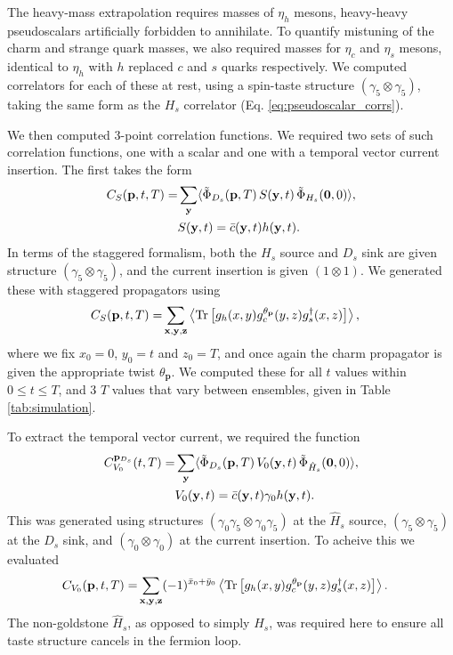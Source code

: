 The heavy-mass extrapolation requires masses of $\eta_h$ mesons, heavy-heavy pseudoscalars artificially forbidden to annihilate. To quantify mistuning of the charm and strange quark masses, we also required masses for $\eta_c$ and $\eta_s$ mesons, identical to $\eta_h$ with $h$ replaced $c$ and $s$ quarks respectively. We computed correlators for each of these at rest, using a spin-taste structure $(\gamma_5\otimes \gamma_5)$, taking the same form as the $H_s$ correlator (Eq. \eqref{eq:pseudoscalar_corrs}).

We then computed 3-point correlation functions. We required two sets of such correlation functions, one with a scalar and one with a temporal vector current insertion. The first takes the form
\begin{align}
  C_S({\textbf{p}},t,T) =& \sum_{{\bf{y}}} \langle \tilde{\Phi}_{D_s}({\bf{p}},T)\, S({\bf{y}},t) \,\tilde{\Phi}_{H_s}({\bf{0}},0) \rangle, \\ &S({\bf{y}},t) = \bar{c}({\bf{y}},t) h({\bf{y}},t). \nonumber
\end{align}
In terms of the staggered formalism, both the $H_s$ source and $D_s$ sink are given structure $(\gamma_5\otimes \gamma_5)$, and the current insertion is given $(1\otimes1)$. We generated these with staggered propagators using
\begin{align}
  C_S({\textbf{p}},t,T) =& \sum_{{\bf{x},\bf{y},\bf{z}}} \left\langle \text{Tr}\left[ g_h(x,y)g^{\theta_{\textbf{p}}}_c(y,z) g^{\dagger}_s(x,z) \right] \right\rangle,
\end{align}
where we fix $x_0 = 0$, $y_0=t$ and $z_0=T$, and once again the charm propagator is given the appropriate twist $\theta_{\textbf{p}}$. We computed these for all $t$ values within $0\leq t\leq T$, and 3 $T$ values that vary between ensembles, given in Table \ref{tab:simulation}.

To extract the temporal vector current, we required the function
\begin{align}
  C^{{\bf{p}}_{D_s}}_{V_0}(t,T) =& \sum_{{\bf{y}}} \langle \tilde{\Phi}_{D_s}({\bf{p}},T)\, V_0({\bf{y}},t) \,\tilde{\Phi}_{\hat{H}_s}({\bf{0}},0) \rangle, \\ &V_0({\bf{y}},t) = \bar{c}({\bf{y}},t) \gamma_0 h({\bf{y}},t). \nonumber
\end{align}
This was generated using structures $(\gamma_0\gamma_5\otimes \gamma_0\gamma_5)$ at the $\hat{H}_s$ source, $(\gamma_5\otimes \gamma_5)$ at the $D_s$ sink, and $(\gamma_0\otimes \gamma_0)$ at the current insertion. To acheive this we evaluated
\begin{align}
  C_{V_0}({\textbf{p}},t,T) =& \sum_{{\bf{x},\bf{y},\bf{z}}} (-1)^{\bar{x}_0+\bar{y}_0} \left\langle \text{Tr}\left[ g_h(x,y)g^{\theta_{\textbf{p}}}_c(y,z) g^{\dagger}_s(x,z) \right] \right\rangle.
\end{align}
The non-goldstone $\hat{H}_s$, as opposed to simply $H_s$, was required here to ensure all taste structure cancels in the fermion loop.

